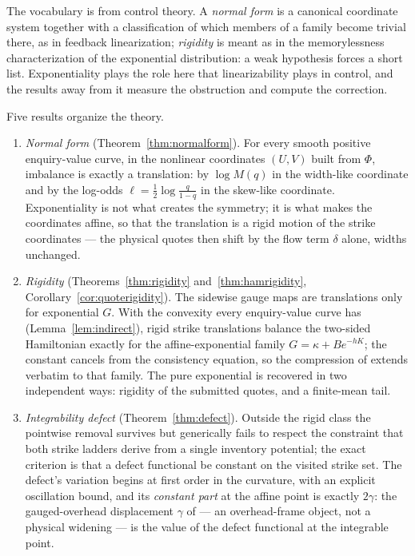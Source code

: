 \documentclass[11pt]{article}
\begin{document}
The vocabulary is from control theory. A \emph{normal form} is a canonical coordinate system together with a classification of which members of a family become trivial there, as in feedback linearization; \emph{rigidity} is meant as in the memorylessness characterization of the exponential distribution: a weak hypothesis forces a short list. Exponentiality plays the role here that linearizability plays in control, and the results away from it measure the obstruction and compute the correction.

Five results organize the theory.

\begin{enumerate}
\item \emph{Normal form} (Theorem~\ref{thm:normalform}). For every smooth positive enquiry-value curve, in the nonlinear coordinates $(U,V)$ built from $\Phi$, imbalance is exactly a translation: by $\log M(q)$ in the width-like coordinate and by the log-odds $\ell = \tfrac12\log\tfrac{q}{1-q}$ in the skew-like coordinate. Exponentiality is not what creates the symmetry; it is what makes the coordinates affine, so that the translation is a rigid motion of the strike coordinates --- the physical quotes then shift by the flow term $\delta$ alone, widths unchanged.
\item \emph{Rigidity} (Theorems~\ref{thm:rigidity} and~\ref{thm:hamrigidity}, Corollary~\ref{cor:quoterigidity}). The sidewise gauge maps are translations only for exponential $G$. With the convexity every enquiry-value curve has (Lemma~\ref{lem:indirect}), rigid strike translations balance the two-sided Hamiltonian exactly for the affine-exponential family $G = \kappa + Be^{-hK}$; the constant cancels from the consistency equation, so the compression of \citet{cotton2026skew} extends verbatim to that family. The pure exponential is recovered in two independent ways: rigidity of the submitted quotes, and a finite-mean tail.
\item \emph{Integrability defect} (Theorem~\ref{thm:defect}). Outside the rigid class the pointwise removal survives but generically fails to respect the constraint that both strike ladders derive from a single inventory potential; the exact criterion is that a defect functional be constant on the visited strike set. The defect's variation begins at first order in the curvature, with an explicit oscillation bound, and its \emph{constant part} at the affine point is exactly $2\gamma$: the gauged-overhead displacement $\gamma$ of \citet{cotton2026skew} --- an overhead-frame object, not a physical widening --- is the value of the defect functional at the integrable point.

\end{enumerate}
\end{document}
